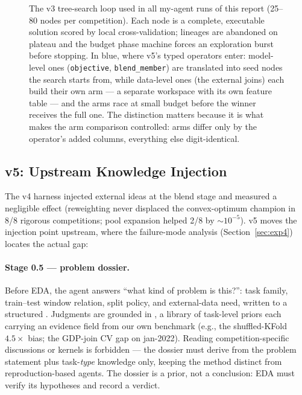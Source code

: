 \documentclass[11pt,a4paper]{article}
\begin{document}
\begin{figure}[htbp]
\caption{The v3 tree-search loop used in all my-agent runs of this report (25--80 nodes per
competition). Each node is a complete, executable solution scored by local cross-validation;
lineages are abandoned on plateau and the budget phase machine forces an exploration burst
before stopping. In blue, where v5's typed operators enter: model-level ones
(\texttt{objective}, \texttt{blend\_member}) are translated into seed nodes the search starts
from, while data-level ones (the external joins) each build their own arm --- a separate
workspace with its own feature table --- and the arms race at small budget before the winner
receives the full one. The distinction matters because it is what makes the arm comparison
controlled: arms differ only by the operator's added columns, everything else digit-identical.}
\label{fig:tree}
\end{figure}

\subsection{v5: Upstream Knowledge Injection}
\label{sec:v5}

The v4 harness injected external ideas at the blend stage and measured a negligible effect (reweighting never displaced the convex-optimum champion in 8/8 rigorous competitions; pool expansion helped 2/8 by ${\sim}10^{-5}$). v5 moves the injection point upstream, where the failure-mode analysis (Section~\ref{sec:exp4}) locates the actual gap:

\paragraph{Stage 0.5 --- problem dossier.} Before EDA, the agent answers ``what kind of problem is this?'': task family, train--test window relation, split policy, and external-data need, written to a structured . Judgments are grounded in , a library of task-level priors each carrying an evidence field from our own benchmark (e.g., the shuffled-KFold $4.5\times$ bias; the GDP-join CV gap on jan-2022). Reading competition-specific discussions or kernels is forbidden --- the dossier must derive from the problem statement plus task-\emph{type} knowledge only, keeping the method distinct from reproduction-based agents. The dossier is a prior, not a conclusion: EDA must verify its hypotheses and record a verdict.
\end{document}
